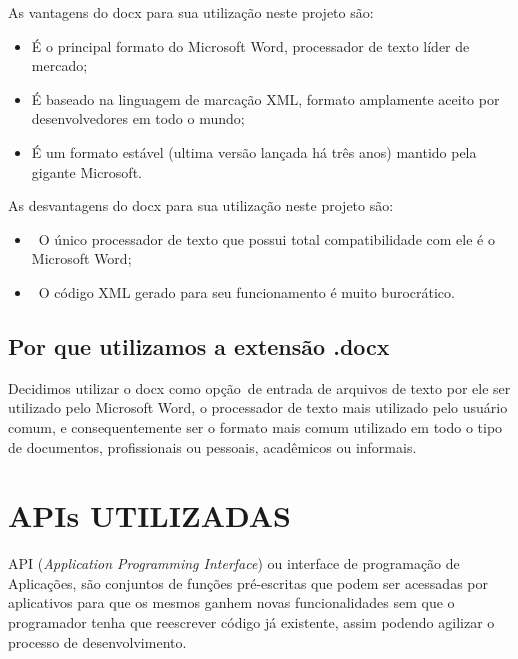 \bigskip

{
As vantagens do docx para sua utiliza\c{c}\~ao neste projeto s\~ao:}

\liststyleLFOvii
\begin{itemize}
\item {
\'E o principal formato do Microsoft Word, processador de texto l\'ider de mercado;}
\item {
\'E baseado na linguagem de marca\c{c}\~ao XML, formato amplamente aceito por desenvolvedores em todo o mundo;}
\item {
\'E um formato est\'avel (ultima vers\~ao lan\c{c}ada h\'a tr\^es anos) mantido pela gigante Microsoft.}
\end{itemize}

\bigskip

{
As desvantagens do docx para sua utiliza\c{c}\~ao neste projeto s\~ao:}

\liststyleLFOviii
\begin{itemize}
\item {
\ O \'unico processador de texto que possui total compatibilidade com ele \'e o Microsoft Word;}
\item {
\ O c\'odigo XML gerado para seu funcionamento \'e muito burocr\'atico.}
\end{itemize}

\bigskip

\subsection[Por que utilizamos a extens\~ao .docx]{ Por que utilizamos a extens\~ao .docx}

\bigskip

{
Decidimos utilizar o docx como op\c{c}\~ao\ de entrada de arquivos de texto por ele ser utilizado pelo Microsoft Word, o
processador de texto mais utilizado pelo usu\'ario comum, e consequentemente ser o formato mais comum utilizado em todo
o tipo de documentos, profissionais ou pessoais, acad\^emicos ou informais.}


\bigskip

\section[APIs UTILIZADAS]{ APIs UTILIZADAS}

\bigskip

{
\textrm{API (}\textrm{\textit{Application Programming Interface}}\textrm{) ou interface de programa\c{c}\~ao de
Aplica\c{c}\~oes, s\~ao conjuntos de fun\c{c}\~oes pr\'e-escritas que podem ser acessadas por aplicativos para que os
mesmos ganhem novas funcionalidades sem que o programador tenha que reescrever c\'odigo j\'a existente, assim podendo
agilizar o processo de desenvolvimento.}}



